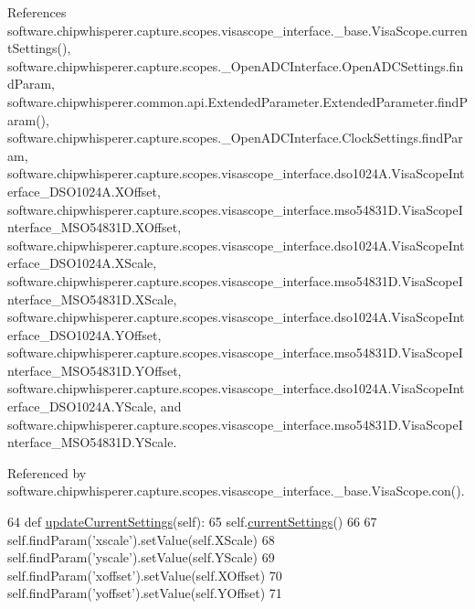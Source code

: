 References software.\+chipwhisperer.\+capture.\+scopes.\+visascope\+\_\+interface.\+\_\+base.\+Visa\+Scope.\+current\+Settings(), software.\+chipwhisperer.\+capture.\+scopes.\+\_\+\+Open\+A\+D\+C\+Interface.\+Open\+A\+D\+C\+Settings.\+find\+Param, software.\+chipwhisperer.\+common.\+api.\+Extended\+Parameter.\+Extended\+Parameter.\+find\+Param(), software.\+chipwhisperer.\+capture.\+scopes.\+\_\+\+Open\+A\+D\+C\+Interface.\+Clock\+Settings.\+find\+Param, software.\+chipwhisperer.\+capture.\+scopes.\+visascope\+\_\+interface.\+dso1024\+A.\+Visa\+Scope\+Interface\+\_\+\+D\+S\+O1024\+A.\+X\+Offset, software.\+chipwhisperer.\+capture.\+scopes.\+visascope\+\_\+interface.\+mso54831\+D.\+Visa\+Scope\+Interface\+\_\+\+M\+S\+O54831\+D.\+X\+Offset, software.\+chipwhisperer.\+capture.\+scopes.\+visascope\+\_\+interface.\+dso1024\+A.\+Visa\+Scope\+Interface\+\_\+\+D\+S\+O1024\+A.\+X\+Scale, software.\+chipwhisperer.\+capture.\+scopes.\+visascope\+\_\+interface.\+mso54831\+D.\+Visa\+Scope\+Interface\+\_\+\+M\+S\+O54831\+D.\+X\+Scale, software.\+chipwhisperer.\+capture.\+scopes.\+visascope\+\_\+interface.\+dso1024\+A.\+Visa\+Scope\+Interface\+\_\+\+D\+S\+O1024\+A.\+Y\+Offset, software.\+chipwhisperer.\+capture.\+scopes.\+visascope\+\_\+interface.\+mso54831\+D.\+Visa\+Scope\+Interface\+\_\+\+M\+S\+O54831\+D.\+Y\+Offset, software.\+chipwhisperer.\+capture.\+scopes.\+visascope\+\_\+interface.\+dso1024\+A.\+Visa\+Scope\+Interface\+\_\+\+D\+S\+O1024\+A.\+Y\+Scale, and software.\+chipwhisperer.\+capture.\+scopes.\+visascope\+\_\+interface.\+mso54831\+D.\+Visa\+Scope\+Interface\+\_\+\+M\+S\+O54831\+D.\+Y\+Scale.



Referenced by software.\+chipwhisperer.\+capture.\+scopes.\+visascope\+\_\+interface.\+\_\+base.\+Visa\+Scope.\+con().


\begin{DoxyCode}
64     \textcolor{keyword}{def }\hyperlink{classsoftware_1_1chipwhisperer_1_1capture_1_1scopes_1_1visascope__interface_1_1__base_1_1VisaScope_a5b5a678f66dd16e74c65f112641fe982}{updateCurrentSettings}(self):
65         self.\hyperlink{classsoftware_1_1chipwhisperer_1_1capture_1_1scopes_1_1visascope__interface_1_1__base_1_1VisaScope_a4c9e946395046c1256563a02da25499a}{currentSettings}()
66 
67         self.findParam(\textcolor{stringliteral}{'xscale'}).setValue(self.XScale)
68         self.findParam(\textcolor{stringliteral}{'yscale'}).setValue(self.YScale)
69         self.findParam(\textcolor{stringliteral}{'xoffset'}).setValue(self.XOffset)
70         self.findParam(\textcolor{stringliteral}{'yoffset'}).setValue(self.YOffset)
71 
\end{DoxyCode}


